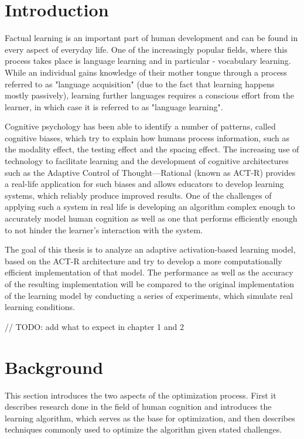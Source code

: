 \documentclass[a4paper]{report}
\begin{document}
\chapter{Introduction}
Factual learning is an important part of human development and can be found in every aspect of everyday life. One of the increasingly popular fields, where this process takes place is language learning and in particular - vocabulary learning. While an individual gains knowledge of their mother tongue through a process referred to as "language acquisition" (due to the fact that learning happens mostly passively), learning further languages requires a conscious effort from the learner, in which case it is referred to as "language learning".

Cognitive psychology has been able to identify a number of patterns, called cognitive biases, which try to explain how humans process information, such as the modality effect, the testing effect and the spacing effect. The increasing use of technology to facilitate learning and the development of cognitive architectures such as the Adaptive Control of Thought—Rational (known as ACT-R) provides a real-life application for such biases and allows educators to develop learning systems, which reliably produce improved results. One of the challenges of applying such a system in real life is developing an algorithm complex enough to accurately model human cognition as well as one that performs efficiently enough to not hinder the learner's interaction with the system.

The goal of this thesis is to analyze an adaptive activation-based learning model, based on the ACT-R architecture and try to develop a more computationally efficient implementation of that model. The performance as well as the accuracy of the resulting implementation will be compared to the original implementation of the learning model by conducting a series of experiments, which simulate real learning conditions.

// TODO: add what to expect in chapter 1 and 2


\chapter{Background}
This section introduces the two aspects of the optimization process. First it describes research done in the field of human cognition and introduces the learning algorithm, which serves as the base for optimization, and then describes techniques commonly used to optimize the algorithm given stated challenges.
\end{document}
